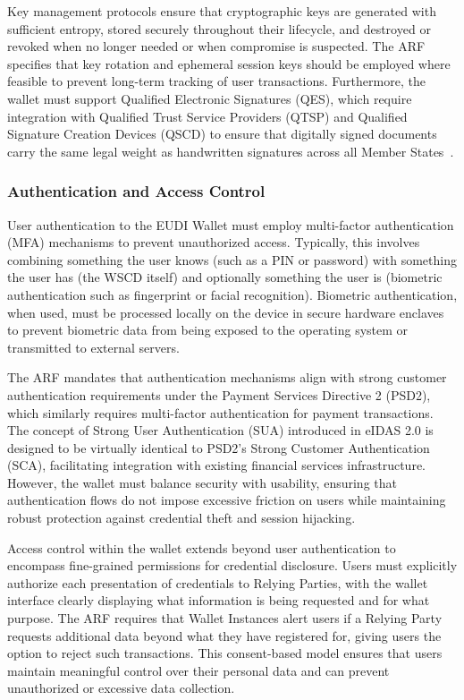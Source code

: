 \documentclass[sigconf,balance,nonacm,authordraft]{acmart}
\begin{document}
Key management protocols ensure that cryptographic keys are generated with sufficient entropy, stored securely throughout their lifecycle, and destroyed or revoked when no longer needed or when compromise is suspected. The ARF specifies that key rotation and ephemeral session keys should be employed where feasible to prevent long-term tracking of user transactions. Furthermore, the wallet must support Qualified Electronic Signatures (QES), which require integration with Qualified Trust Service Providers (QTSP) and Qualified Signature Creation Devices (QSCD) to ensure that digitally signed documents carry the same legal weight as handwritten signatures across all Member States~\cite{EU_ARF2024,EU_eIDAS2024}.

\subsubsection{Authentication and Access Control}

User authentication to the EUDI Wallet must employ multi-factor authentication (MFA) mechanisms to prevent unauthorized access. Typically, this involves combining something the user knows (such as a PIN or password) with something the user has (the WSCD itself) and optionally something the user is (biometric authentication such as fingerprint or facial recognition). Biometric authentication, when used, must be processed locally on the device in secure hardware enclaves to prevent biometric data from being exposed to the operating system or transmitted to external servers.

The ARF mandates that authentication mechanisms align with strong customer authentication requirements under the Payment Services Directive 2 (PSD2), which similarly requires multi-factor authentication for payment transactions. The concept of Strong User Authentication (SUA) introduced in eIDAS 2.0 is designed to be virtually identical to PSD2's Strong Customer Authentication (SCA), facilitating integration with existing financial services infrastructure. However, the wallet must balance security with usability, ensuring that authentication flows do not impose excessive friction on users while maintaining robust protection against credential theft and session hijacking.

Access control within the wallet extends beyond user authentication to encompass fine-grained permissions for credential disclosure. Users must explicitly authorize each presentation of credentials to Relying Parties, with the wallet interface clearly displaying what information is being requested and for what purpose. The ARF requires that Wallet Instances alert users if a Relying Party requests additional data beyond what they have registered for, giving users the option to reject such transactions. This consent-based model ensures that users maintain meaningful control over their personal data and can prevent unauthorized or excessive data collection.
\end{document}

